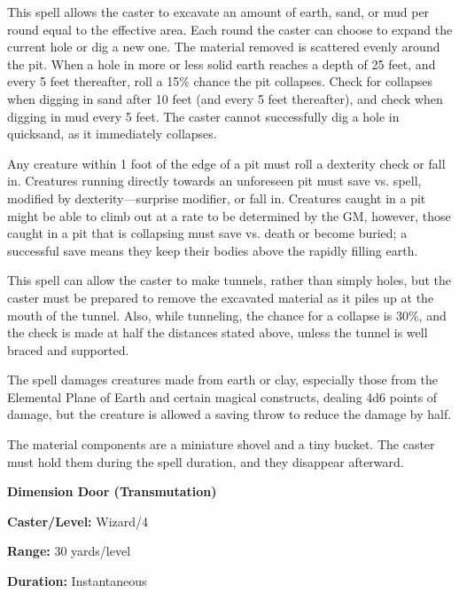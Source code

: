 \begin{multicols}{2}
\begin{minipage}{\columnwidth}
\end{minipage}

This spell allows the caster to excavate an amount of earth, sand, or mud per round equal to the effective area.  Each round the caster can choose to expand the current hole or dig a new one.  The material removed is scattered evenly around the pit.  When a hole in more or less solid earth reaches a depth of 25 feet, and every 5 feet thereafter, roll a 15\% chance the pit collapses.  Check for collapses when digging in sand after 10 feet (and every 5 feet thereafter), and check when digging in mud every 5 feet.  The caster cannot successfully dig a hole in quicksand, as it immediately collapses.

Any creature within 1 foot of the edge of a pit must roll a dexterity check or fall in.  Creatures running directly towards an unforeseen pit must save vs. spell, modified by dexterity---surprise modifier, or fall in.  Creatures caught in a pit might be able to climb out at a rate to be determined by the GM, however, those caught in a pit that is collapsing must save vs. death or become buried; a successful save means they keep their bodies above the rapidly filling earth.  

This spell can allow the caster to make tunnels, rather than simply holes, but the caster must be prepared to remove the excavated material as it piles up at the mouth of the tunnel.  Also, while tunneling, the chance for a collapse is 30\%, and the check is made at half the distances stated above, unless the tunnel is well braced and supported.

The spell damages creatures made from earth or clay, especially those from the Elemental Plane of Earth and certain magical constructs, dealing 4d6 points of damage, but the creature is allowed a saving throw to reduce the damage by half.

The material components are a miniature shovel and a tiny bucket.  The caster must hold them during the spell duration, and they disappear afterward.

\vspace{1em}

\noindent
\begin{minipage}{\columnwidth}

\noindent \textbf{Dimension Door (Transmutation)}

\noindent \textbf{Caster/Level:} Wizard/4

\noindent \textbf{Range:} 30 yards/level

\noindent \textbf{Duration:} Instantaneous


\end{minipage}
\end{multicols}
